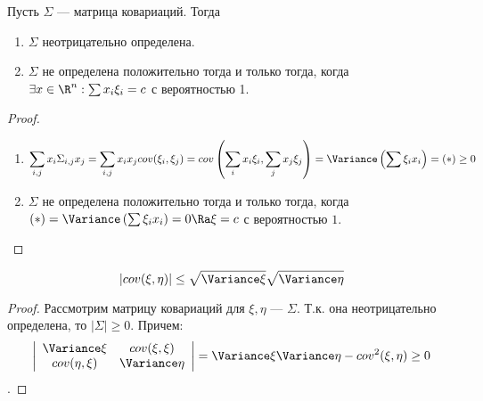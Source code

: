 \begin{proposition}
    Пусть \(\Sigma\) --- матрица ковариаций. Тогда
    \begin{enumerate}
        \item \(\Sigma\) неотрицательно определена.
        \item \(\Sigma\) не определена положительно тогда и только тогда, когда \(\exists x \in \R^n: \sum x_i\xi_i = c\) с вероятностью 1.
    \end{enumerate}
\end{proposition}
\begin{proof}
    \begin{enumerate}
        \item \[\sum_{i, j}x_i\Sigma_{i, j}x_j = \sum_{i, j} x_ix_j cov(\xi_i, \xi_j) = cov\left(\sum_i x_i\xi_i, \sum_j x_j\xi_j\right) = \Variance \left(\sum \xi_i x_i\right) = (*) \ge 0\]
        \item \(\Sigma\) не определена положительно тогда и только тогда, когда \((*) = \Variance \left(\sum \xi_i x_i\right) = 0 \Ra \xi = c\) с вероятностью \(1\).
    \end{enumerate}
\end{proof}

\begin{proposition}
    \[|cov(\xi, \eta)| \le \sqrt{\Variance \xi}\sqrt{\Variance \eta}\]
\end{proposition}
\begin{proof}
    Рассмотрим матрицу ковариаций для \(\xi, \eta\) --- \(\Sigma\). Т.к. она неотрицательно определена, то \(|\Sigma| \ge 0\). Причем:
    \[\left|\begin{array}{cc}
        \Variance \xi & cov(\xi, \xi) \\ 
        cov(\eta, \xi) & \Variance \eta \\ 
    \end{array}\right| = \Variance \xi \Variance \eta - cov^2(\xi, \eta)\ge 0\].
\end{proof}
